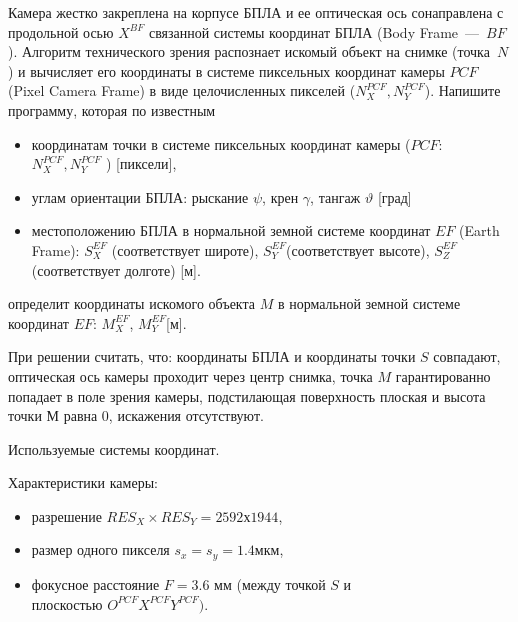 
Камера жестко закреплена на корпусе БПЛА и ее оптическая ось сонаправлена с
продольной осью $X^{BF}$ связанной системы координат БПЛА (Body Frame~—~$BF$). Алгоритм технического зрения распознает искомый объект на снимке (точка~$N$) и вычисляет его координаты в системе пиксельных
координат камеры $PCF$ (Pixel Camera Frame) в виде целочисленных пикселей ($N^{PCF}_X, N^{PCF}_Y$). 
Напишите программу, которая по известным 

\begin{itemize}
    \item координатам точки в системе пиксельных координат камеры ($PCF$: \linebreak $N^{PCF}_X, N^{PCF}_Y$ ) [пиксели],
    \item углам ориентации БПЛА: рыскание $ \psi $, крен $ \gamma $, тангаж $ \vartheta $ [град]
    \item местоположению БПЛА в нормальной земной системе координат $EF$ (Earth Frame): $S_X^{EF}$ 
    (соответствует широте), 
    $ S_Y^{EF} $(соответствует высоте), \linebreak $ S_Z^{EF} $(соответствует долготе) [м].
\end{itemize}

определит координаты искомого объекта $ M $ в нормальной земной системе координат $ EF $: $ M_X^{EF} $, $ M_Y^{EF} $[м].
 
При решении считать, что: координаты БПЛА и координаты точки $ S $ совпадают, оптическая ось 
камеры проходит через центр снимка, точка $ M $ гарантированно попадает в поле зрения камеры, 
подстилающая поверхность плоская и высота точки М равна 0, искажения отсутствуют.


\begin{center}
Используемые системы координат.
\end{center}

Характеристики камеры:

\begin{itemize}
    \item разрешение $RES_X \times RES_Y = 2592 х 1944$,
    \item размер одного пикселя $s_x = s_y = 1.4 \text{мкм}$,
    \item фокусное расстояние $ F = 3.6$ мм (между точкой $S$ и \\ плоскостью $O^{PCF}X^{PCF}Y^{PCF}) $.
\end{itemize}


